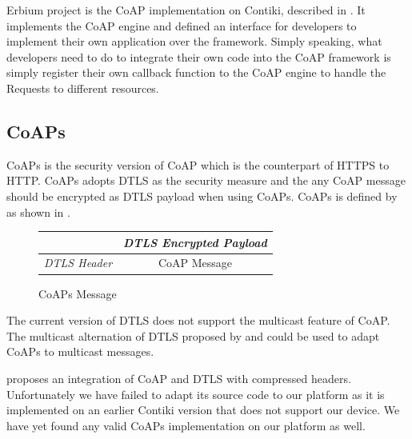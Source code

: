 Erbium\cite{Erbium} project is the CoAP implementation on Contiki, described in \cite{ContikiCoap}. It implements the CoAP engine and defined an interface for developers to implement their own application over the framework. Simply speaking, what developers need to do to integrate their own code into the CoAP framework is simply register their own callback function to the CoAP engine to handle the Requests to different resources.

\subsection{CoAPs}
CoAPs is the security version of CoAP which is the counterpart of HTTPS to HTTP. CoAPs adopts DTLS as the security measure and the any CoAP message should be encrypted as DTLS payload when using CoAPs. CoAPs is defined by \cite{rfc7252} as shown in .

\begin{figure}[h!]
	\center
	\begin{tabular}{cc}
		\textit{}                                  & \textit{DTLS Encrypted Payload}            \\ \hline
		\multicolumn{1}{|c|}{\textit{DTLS Header}} & \multicolumn{1}{c|}{CoAP Message} \\ \hline
	\end{tabular}
	\caption{CoAPs Message}
	\label{Fig: CoAPs Message}
\end{figure}

The current version of DTLS does not support the multicast feature of CoAP. The multicast alternation of DTLS proposed by \cite{DtlsMulticast1} and \cite{DtlsMulticast2} could be used to adapt CoAPs to multicast messages.

\cite{Lithe} proposes an integration of CoAP and DTLS with compressed headers. Unfortunately we have failed to adapt its source code to our platform as it is implemented on an earlier Contiki version that does not support our device. We have yet found any valid CoAPs implementation on our platform as well.


